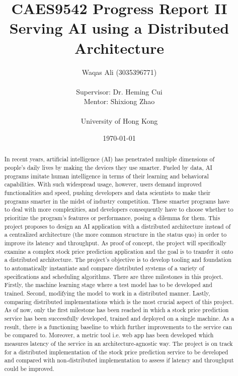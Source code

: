 \documentclass{report}
\title{CAES9542 Progress Report II \\ Serving AI using a Distributed Architecture}
\author{Waqas Ali (3035396771)\\\\Supervisor: Dr. Heming Cui\\Mentor: Shixiong Zhao\\\\University of Hong Kong}
\date{\today}
\def\frontmatter{%
    \pagenumbering{roman}
    \setcounter{page}{1}
    \renewcommand{\thesection}{\Roman{section}}
}%
\begin{document}
\maketitle

\frontmatter

\begin{abstract}
\thispagestyle{plain}

In recent years, artificial intelligence (AI) has penetrated multiple dimensions of people's daily lives by making the devices they use smarter.
Fueled by data, AI programs imitate human intelligence in terms of their learning and behavioral capabilities.
With such widespread usage, however, users demand improved functionalities and speed, pushing developers and data scientists to make their programs smarter in the midst of industry competition.
These smarter programs have to deal with more complexities, and developers consequently have to choose whether to prioritize the program's features or performance, posing a dilemma for them.
This project proposes to design an AI application with a distributed architecture instead of a centralized architecture (the more common structure in the status quo) in order to improve its latency and throughput.
As proof of concept, the project will specifically examine a complex stock price prediction application and the goal is to transfer it onto a distributed architecture.
The project's objective is to develop tooling and foundation to automatically instantiate and compare distributed systems of a variety of specifications and scheduling algorithms.
There are three milestones in this project.
Firstly, the machine learning stage where a test model has to be developed and trained.
Second, modifying the model to work in a distributed manner.
Lastly, comparing distributed implementations which is the most crucial aspect of this project.
As of now, only the first milestone has been reached in which a stock price prediction service has been successfully developed, trained and deployed on a single machine.
As a result, there is a functioning baseline to which further improvements to the service can be compared to.
Moreover, a metric tool i.e. web app has been developed which measures latency of the service in an architecture-agnostic way.
The project is on track for a distributed implementation of the stock price prediction service to be developed and compared with non-distributed implementation to assess if latency and throughput could be improved.
\end{abstract}
\end{document}
